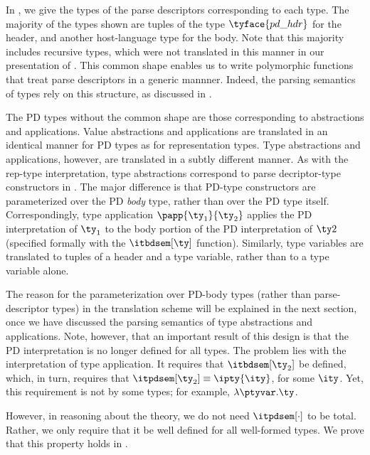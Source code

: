 In , we give the types of the parse descriptors
corresponding to each \ddc{} type. The majority of the types shown are
tuples of the type $\tyface{pd\_hdr}$ for the header, and another
host-language type for the body. Note that this majority includes
recursive types, which were not translated in this manner in our
presentation of \ddcold{}. This common shape enables us to write
polymorphic functions that treat parse descriptors in a generic
mannner. Indeed, the parsing semantics of types rely on this
structure, as discussed in .

The PD types without the common shape are those corresponding to
abstractions and applications. Value abstractions and applications are
translated in an identical manner for PD types as for representation
types.  Type abstractions and applications, however, are translated in
a subtly different manner. As with the rep-type interpretation, type
abstractions correspond to parse decriptor-type constructors in
\fomega. The major difference is that PD-type constructors are
parameterized over the PD \emph{body} type, rather than over the PD
type itself. Correspondingly, type application $\papp {\ty_1}{\ty_2}$ applies
the PD interpretation of $\ty_1$ to the body portion of the PD
interpretation of $\ty2$ (specified formally with the $\itbdsem[\ty]$
function). Similarly, type variables are translated to tuples of a
header and a type variable, rather than to a type variable alone. 

The reason for the parameterization over PD-body types (rather than
parse-descriptor types) in the translation scheme will be
explained in the next section, once we have discussed the parsing
semantics of type abstractions and applications. Note, however, that
an important result of this design is that the PD interpretation is no
longer defined for all types. The problem lies with
the interpretation of type application. It requires that
$\itbdsem[\ty_2]$ be defined, which, in turn, requires that 
$\itpdsem[\ty_2] \equiv \ipty{\ity}$, for some $\ity$. Yet, this
requirement is not by some types; for example, $\lambda \ptyvar.\ty$.

However, in reasoning about the theory, we do not need
$\itpdsem[\cdot]$ to be total. Rather, we only require that it be well
defined for all well-formed types. We prove that this property holds
in .


